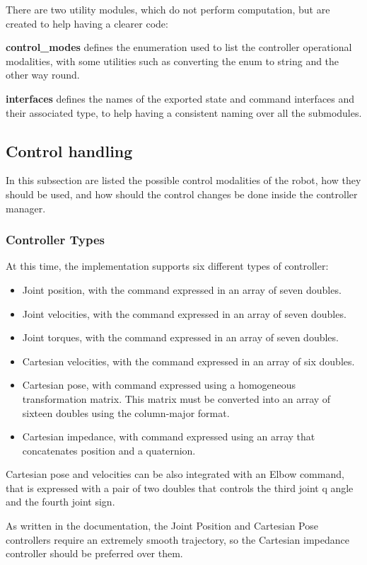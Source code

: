 \documentclass{article}
\begin{document}
There are two utility modules, which do not perform computation, but are created to help having a clearer code:

\textbf{control\_modes} defines the enumeration used to list the controller operational modalities, with some utilities such as converting the enum to string and the other way round.

\textbf{interfaces} defines the names of the exported state and command interfaces and their associated type, to help having a consistent naming over all the submodules.

\subsection{Control handling}
In this subsection are listed the possible control modalities of the robot, how they should be used, and how should the control changes be done inside the controller manager. 
\subsubsection{Controller Types}
At this time, the implementation supports six different types of controller:
\begin{itemize}
    \item Joint position, with the command expressed in an array of seven doubles.
    \item Joint velocities, with the command expressed in an array of seven doubles.
    \item Joint torques, with the command expressed in an array of seven doubles.
    \item Cartesian velocities, with the command expressed in an array of six doubles.
    \item Cartesian pose, with command expressed using a homogeneous transformation matrix. This matrix must be converted into an array of sixteen doubles using the column-major format.
    \item Cartesian impedance, with command expressed using an array that concatenates position and a quaternion.
\end{itemize}

Cartesian pose and velocities can be also integrated with an Elbow command, that is expressed with a pair of two doubles that controls the third joint q angle and the fourth joint sign.

As written in the documentation, the Joint Position and Cartesian Pose controllers require an extremely smooth trajectory, so the Cartesian impedance controller should be preferred over them.
\end{document}
